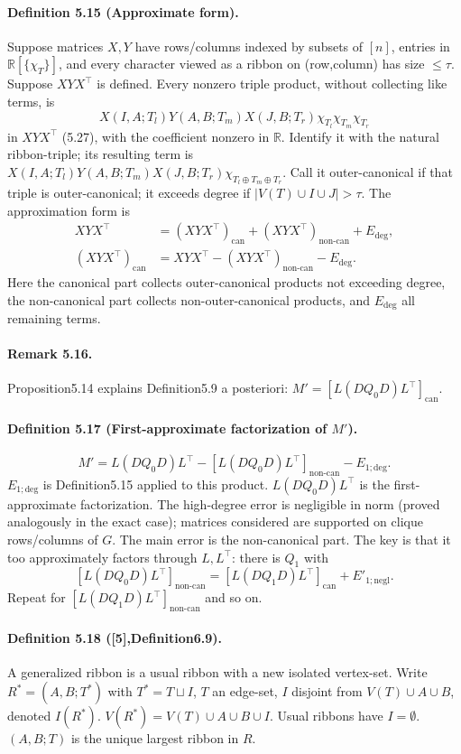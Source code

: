 \paragraph{Definition 5.15 (Approximate form).} Suppose matrices $X,Y$ have rows/columns indexed by subsets of $[n]$, entries in $\mathbb R[\{\chi_T\}]$, and every character viewed as a ribbon on (row,column) has size $\le\tau$. Suppose $XYX^\top$ is defined. Every nonzero triple product, without collecting like terms, is
\[X(I,A;T_l)Y(A,B;T_m)X(J,B;T_r)\chi_{T_l}\chi_{T_m}\chi_{T_r}\tag{5.28}\]
in $XYX^\top$ (5.27), with the coefficient nonzero in $\mathbb R$. Identify it with the natural ribbon-triple; its resulting term is $X(I,A;T_l)Y(A,B;T_m)X(J,B;T_r)\chi_{T_l\oplus T_m\oplus T_r}$. Call it outer-canonical if that triple is outer-canonical; it exceeds degree if $|V(T)\cup I\cup J|>\tau$. The approximation form is
\begin{align*}XYX^\top&=(XYX^\top)_{\mathrm{can}}+(XYX^\top)_{\mathrm{non\text{-}can}}+E_{\mathrm{deg}},\\(XYX^\top)_{\mathrm{can}}&=XYX^\top-(XYX^\top)_{\mathrm{non\text{-}can}}-E_{\mathrm{deg}}.\tag{5.29}\end{align*}
Here the canonical part collects outer-canonical products not exceeding degree, the non-canonical part collects non-outer-canonical products, and $E_{\mathrm{deg}}$ all remaining terms.
\paragraph{Remark 5.16.} Proposition5.14 explains Definition5.9 a posteriori: $M'=[L(DQ_0D)L^\top]_{\mathrm{can}}$.
\paragraph{Definition 5.17 (First-approximate factorization of $M'$).}
\[M'=L(DQ_0D)L^\top-[L(DQ_0D)L^\top]_{\mathrm{non\text{-}can}}-E_{1;\mathrm{deg}}.\tag{5.30}\]
$E_{1;\mathrm{deg}}$ is Definition5.15 applied to this product. $L(DQ_0D)L^\top$ is the first-approximate factorization. The high-degree error is negligible in norm (proved analogously in the exact case); matrices considered are supported on clique rows/columns of $G$. The main error is the non-canonical part. The key is that it too approximately factors through $L,L^\top$: there is $Q_1$ with
\[[L(DQ_0D)L^\top]_{\mathrm{non\text{-}can}}=[L(DQ_1D)L^\top]_{\mathrm{can}}+E'_{1;\mathrm{negl}}.\tag{5.31}\]
Repeat for $[L(DQ_1D)L^\top]_{\mathrm{non\text{-}can}}$ and so on.
\paragraph{Definition 5.18 ([5],Definition6.9).} A generalized ribbon is a usual ribbon with a new isolated vertex-set. Write $R^*=(A,B;T^*)$ with $T^*=T\sqcup I$, $T$ an edge-set, $I$ disjoint from $V(T)\cup A\cup B$, denoted $I(R^*)$. $V(R^*)=V(T)\cup A\cup B\cup I$. Usual ribbons have $I=\emptyset$. $(A,B;T)$ is the unique largest ribbon in $R$.
